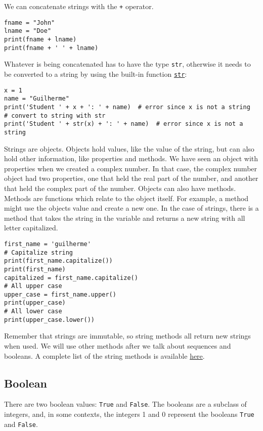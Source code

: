 \documentclass[12pt, a4paper]{article}
\begin{document}
We can concatenate strings with the \texttt{+} operator.
\lstset{language=jupyter-python,label= ,caption= ,captionpos=b,numbers=none}
\begin{lstlisting}
fname = "John"
lname = "Doe"
print(fname + lname)
print(fname + ' ' + lname)
\end{lstlisting}
Whatever is being concatenated has to have the type \texttt{str}, otherwise it needs to be converted to a string by using the built-in function \href{https://docs.python.org/3.6/library/functions.html?\#func-str}{\texttt{str}}:
\lstset{language=jupyter-python,label= ,caption= ,captionpos=b,numbers=none}
\begin{lstlisting}
x = 1
name = "Guilherme"
print('Student ' + x + ': ' + name)  # error since x is not a string
# convert to string with str
print('Student ' + str(x) + ': ' + name)  # error since x is not a string
\end{lstlisting}
Strings are objects.
Objects hold values, like the value of the string, but can also hold other information, like properties and methods.
We have seen an object with properties when we created a complex number.
In that case, the complex number object had two properties, one that held the real part of the number, and another that held the complex part of the number.
Objects can also have methods.
Methods are functions which relate to the object itself.
For example, a method might use the objects value and create a new one.
In the case of strings, there is a method that takes the string in the variable and returns a new string with all letter capitalized.
\lstset{language=jupyter-python,label= ,caption= ,captionpos=b,numbers=none}
\begin{lstlisting}
first_name = 'guilherme'
# Capitalize string
print(first_name.capitalize())
print(first_name)
capitalized = first_name.capitalize()
# All upper case
upper_case = first_name.upper()
print(upper_case)
# All lower case
print(upper_case.lower())
\end{lstlisting}
Remember that strings are immutable, so string methods all return new strings when used.
We will use other methods after we talk about sequences and booleans.
A complete list of the string methods is available \href{https://docs.python.org/3.6/library/stdtypes.html\#string-methods}{here}.
\subsection{Boolean}
\label{sec:orge63c3fc}
There are two boolean values: \texttt{True} and \texttt{False}.
The booleans are a subclass of integers, and, in some contexts, the integers 1 and 0 represent the booleans \texttt{True} and \texttt{False}.
\end{document}
